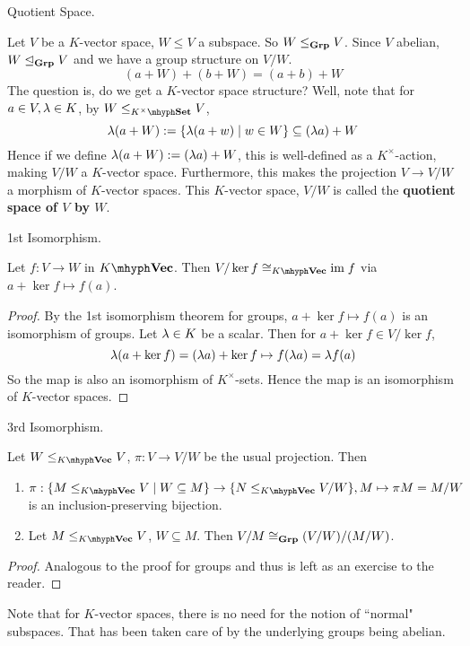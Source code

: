 \documentclass[../../book.tex]{subfiles}
\begin{document}
\begin{dfn} Quotient Space.

    Let $V$ be a $K$-vector space, $W \leq V$ a subspace.
    So $W \leq_{\mathbf{Grp}} V$. 
    Since $V$ abelian, $W \trianglelefteq_{\mathbf{Grp}} V$ and we have a group structure on $V / W$.
    \[ 
        (a + W) + (b + W) = (a + b) + W
    \]
    The question is, do we get a $K$-vector space structure?
    Well, note that for $a \in V, \lambda \in K$, 
    by $W \leq_{K^\times\mhyph\Set} V$,
    \[\lambda (a + W) := \{\lambda(a + w) \mid w \in W\} \subseteq (\lambda a) + W\]
    Hence if we define $\lambda(a + W) := (\lambda a) + W$, 
    this is well-defined as a $K^\times$-action,
    making $V/W$ a $K$-vector space.
    Furthermore, this makes the projection $V \to V/W$ 
    a morphism of $K$-vector spaces. 
    This $K$-vector space, $V/W$ is called the \textbf{quotient space of $V$ by $W$}.
\end{dfn}
\begin{thm} 1st Isomorphism. 
    
    Let $f : V \to W$ in $\KVec$. 
    Then $V / \ker f \iso_{\KVec} \im f$ via $a + \ker f \mapsto f(a)$.
\end{thm}
\begin{proof}
    By the 1st isomorphism theorem for groups, 
    $a + \ker f \mapsto f(a)$ is an isomorphism of groups. 
    Let $\lambda \in K$ be a scalar. 
    Then for $a + \ker f \in V/\ker f$, 
    \[
        \lambda(a + \ker f) = (\lambda a) + \ker f \mapsto 
        f(\lambda a) = \lambda f(a)
    \]
    So the map is also an isomorphism of $K^\times$-sets.
    Hence the map is an isomorphism of $K$-vector spaces. 
\end{proof}
\begin{thm} 3rd Isomorphism. 

    Let $W \leq_{\KVec} V$, $\pi : V \to V/W$ be the usual projection. 
    Then 
    \begin{enumerate}
        \item $\pi : 
        \{M \leq_{\KVec} V \mid W \subseteq M\} \to \{N \leq_{\KVec} V/W\}, 
        M \mapsto \pi M = M/W$ is an inclusion-preserving bijection.
        \item Let $M \leq_{\KVec} V$, $W \subseteq M$. 
        Then $V / M \cong_{\mathbf{Grp}} (V / W) / (M / W)$. 
    \end{enumerate}
\end{thm}
\begin{proof}
    Analogous to the proof for groups
    and thus is left as an exercise to the reader. 
\end{proof}

\begin{rmk}
    Note that for $K$-vector spaces, there is no need 
    for the notion of ``normal" subspaces. 
    That has been taken care of by the underlying groups being abelian.
\end{rmk}

\end{document}
